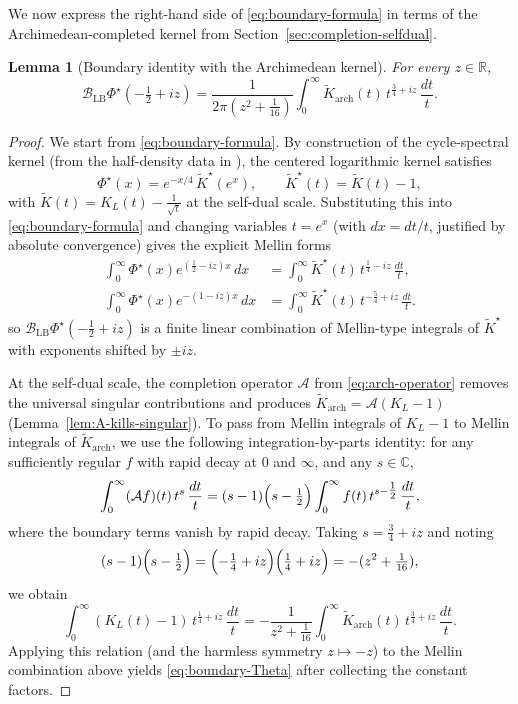 \documentclass[11pt]{amsart}
\newtheorem{lemma}[theorem]{Lemma}
\theoremstyle{definition}
\theoremstyle{remark}
\newcommand{\R}{\mathbb{R}}
\newcommand{\C}{\mathbb{C}}
\begin{document}
We now express the right-hand side of \eqref{eq:boundary-formula} in terms of
the Archimedean-completed kernel from Section~\ref{sec:completion-selfdual}.

\begin{lemma}[Boundary identity with the Archimedean kernel]
\label{lem:boundary-Theta}
For every $z\in\R$,
\begin{equation}
\label{eq:boundary-Theta}
\mathcal B_{\mathrm{LB}}\Phi^{\star}\!\left(-\tfrac12+iz\right)
=
\frac{1}{2\pi\left(z^2+\tfrac1{16}\right)}
\int_{0}^{\infty}\widetilde K_{\mathrm{arch}}(t)\,
t^{\frac34+iz}\,\frac{dt}{t}.
\end{equation}
\end{lemma}

\begin{proof}
We start from \eqref{eq:boundary-formula}. By construction of the cycle-spectral kernel
(from the half-density data in \cite{PaperI}), the centered logarithmic kernel satisfies
\[
\Phi^{\star}(x)=e^{-x/4}\,\widetilde K^{\star}(e^x),
\qquad \widetilde K^{\star}(t)=\widetilde K(t)-1,
\]
with $\widetilde K(t)=K_L(t)-\frac{1}{\sqrt t}$ at the self-dual scale.
Substituting this into \eqref{eq:boundary-formula} and changing variables $t=e^x$
(with $dx=dt/t$, justified by absolute convergence) gives the explicit Mellin forms
\begin{align*}
\int_{0}^{\infty}\Phi^{\star}(x)e^{(\frac12-iz)x}\,dx
&=\int_{0}^{\infty}\widetilde K^{\star}(t)\,t^{\frac14-iz}\,\frac{dt}{t},\\
\int_{0}^{\infty}\Phi^{\star}(x)e^{-(1-iz)x}\,dx
&=\int_{0}^{\infty}\widetilde K^{\star}(t)\,t^{-\frac54+iz}\,\frac{dt}{t}.
\end{align*}
so $\mathcal B_{\mathrm{LB}}\Phi^{\star}(-\tfrac12+iz)$ is a finite linear combination of Mellin-type
integrals of $\widetilde K^{\star}$ with exponents shifted by $\pm iz$.

At the self-dual scale, the completion operator $\mathcal A$ from \eqref{eq:arch-operator}
removes the universal singular contributions and produces
$\widetilde K_{\mathrm{arch}}=\mathcal A(K_L-1)$ (Lemma~\ref{lem:A-kills-singular}).
To pass from Mellin integrals of $K_L-1$ to Mellin integrals of $\widetilde K_{\mathrm{arch}}$, we use
the following integration-by-parts identity: for any sufficiently regular $f$ with rapid decay at $0$ and $\infty$,
and any $s\in\C$,
\begin{equation}\label{eq:mellin-A-identity}
\int_{0}^{\infty}(\mathcal A f)(t)\,t^{s}\,\frac{dt}{t}
=(s-1)\Bigl(s-\tfrac12\Bigr)\int_{0}^{\infty} f(t)\,t^{s-\tfrac12}\,\frac{dt}{t},
\end{equation}
where the boundary terms vanish by rapid decay.
Taking $s=\tfrac34+iz$ and noting
\[
(s-1)\Bigl(s-\tfrac12\Bigr)=\Bigl(-\tfrac14+iz\Bigr)\Bigl(\tfrac14+iz\Bigr)=-(z^2+\tfrac1{16}),
\]
we obtain
\[
\int_{0}^{\infty} (K_L(t)-1)\,t^{\frac14+iz}\,\frac{dt}{t}
=-\frac{1}{z^2+\tfrac1{16}}\int_{0}^{\infty}\widetilde K_{\mathrm{arch}}(t)\,t^{\frac34+iz}\,\frac{dt}{t}.
\]
Applying this relation (and the harmless symmetry $z\mapsto -z$) to the Mellin combination above yields
\eqref{eq:boundary-Theta} after collecting the constant factors.


\end{proof}
\end{document}

